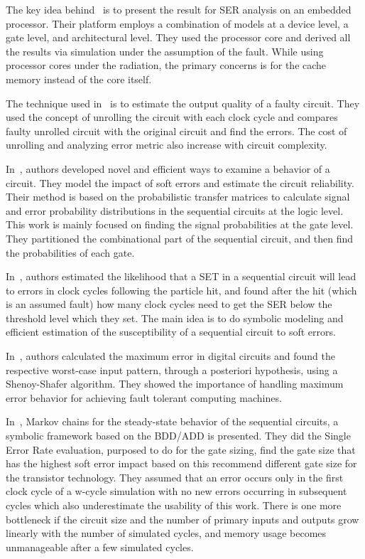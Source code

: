   
The key idea behind~\citep{ebrahimi2015comprehensive} is to present the result for SER analysis on an embedded
processor. Their platform employs a combination of models at a device level, a gate level, and architectural level. They used the
processor core and derived all the results via simulation under the assumption of the fault. While using processor cores under the radiation, the primary concerns is for the cache memory instead
of the core itself.

The technique used in~\citep{ranjan2014aslan} is to estimate the output quality of a faulty circuit. They used the concept
of unrolling the circuit with each clock cycle and compares faulty unrolled circuit with the original circuit and find the errors.
The cost of unrolling and analyzing error metric also increase
with circuit complexity.

In~\citep{yu2010scalable}, authors developed novel and efficient ways to examine a behavior of a circuit. They model the impact of soft errors and estimate the circuit reliability. Their method is based on the probabilistic transfer matrices to calculate signal and error probability distributions in the
sequential circuits at the logic level. This work is mainly focused on finding the signal probabilities at the gate level. They partitioned the combinational part of the sequential circuit, and then find the probabilities of each gate.

In~\citep{miskov2007mars},  authors estimated the likelihood that a SET in a sequential circuit will lead to errors
in clock cycles following the particle hit, and found after the hit (which is an assumed fault) how many clock
cycles need to get the SER below the threshold level which they set. The main idea is to do symbolic modeling and efficient estimation of the susceptibility of a sequential circuit to soft errors.

In~\citep{lingasubramanian2010probabilistic}, authors calculated the maximum error in digital circuits and found the respective
worst-case input pattern, through a posteriori hypothesis, using a Shenoy-Shafer algorithm.
They showed the importance of handling maximum error behavior for achieving fault tolerant
computing machines.

In~\citep{miskov2008modeling}, Markov chains for the steady-state behavior of the sequential circuits, a symbolic framework
based on the BDD/ADD is presented. They did the Single Error Rate evaluation, purposed to do
for the gate sizing, find the gate size that has the highest soft error impact based on this recommend
different gate size for the transistor technology. They assumed that an error occurs only in the first clock cycle of a w-cycle simulation with
no new errors occurring in subsequent cycles which also underestimate the usability of this work.  There is one more bottleneck if the circuit size and the number of primary
inputs and outputs grow linearly with the number of simulated cycles, and memory usage becomes
unmanageable after a few simulated cycles.
 

